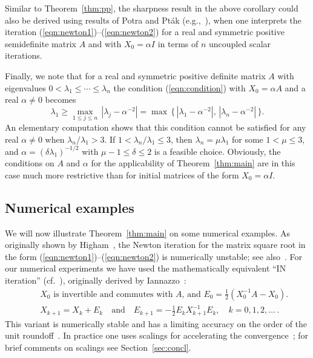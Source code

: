 \documentclass{siamltex}
\begin{document}
\medskip
Similar to Theorem~\ref{thm:pp}, the sharpness result in the above corollary could also be derived
using results of Potra and Pt\'ak (e.g.,~\cite[Proposition~5.10]{PotPtaBook84}),
when one interprets the iteration (\ref{eqn:newton1})--(\ref{eqn:newton2}) for a real and
symmetric positive semidefinite matrix $A$ and with $X_0=\alpha I$ in terms of $n$ uncoupled
scalar iterations.

Finally, we note that for a real and symmetric positive definite matrix $A$ with
eigenvalues $0<\lambda_1\leq\cdots\leq\lambda_n$ the condition (\ref{eqn:condition})
with $X_0=\alpha A$ and a real $\alpha\neq 0$ becomes
$$\lambda_1 \geq \max_{1\leq j\leq n} \,|\lambda_j-\alpha^{-2}|=
\max\,\{\,|\lambda_1-\alpha^{-2}|,\,|\lambda_n-\alpha^{-2}|\,\}.$$
An elementary computation shows that this condition cannot be satisfied for any
real $\alpha\neq 0$ when $\lambda_n/\lambda_1>3$. If $1<\lambda_n/\lambda_1\leq 3$,
then $\lambda_n=\mu\lambda_1$ for some $1< \mu\leq 3$, and
$\alpha=(\delta\lambda_1)^{-1/2}$ with $\mu-1\leq \delta\leq 2$ is a feasible
choice. Obviously, the conditions on $A$ and $\alpha$ for the applicability of
Theorem~\ref{thm:main} are in this case much more restrictive than for initial matrices of
the form $X_0=\alpha I$. 

\subsection{Numerical examples}\label{sec:numer}
We will now illustrate Theorem~\ref{thm:main} on some numerical examples.
As originally shown by Higham~\cite{Hig86a}, the Newton iteration for the matrix square root
in the form (\ref{eqn:newton1})--(\ref{eqn:newton2}) is numerically unstable; see
also~\cite[Section~6.4]{HigBook08}. For our numerical experiments we have used the
mathematically equivalent ``IN iteration'' (cf.~\cite[Equation (6.20)]{HigBook08}),
originally derived by Iannazzo~\cite{Ian03}:
\begin{eqnarray}
& & \mbox{$X_0$ is invertible and commutes with $A$, and $E_0=\frac12 (X_0^{-1}A-X_0)$.}\label{eqn:in1}\\
& & X_{k+1} = X_k+E_k\quad\mbox{and}\quad
E_{k+1} = -\frac12 E_kX_{k+1}^{-1}E_k,\quad k=0,1,2,\dots\,.\label{eqn:in2}
\end{eqnarray}
This variant is numerically stable and has a limiting accuracy on the order of the unit
roundoff~\cite[Table~6.2]{HigBook08}. In practice one uses scalings for accelerating 
the convergence~\cite[Section~6.5]{HigBook08}; for brief comments on scalings see 
Section~\ref{sec:concl}.
\end{document}
